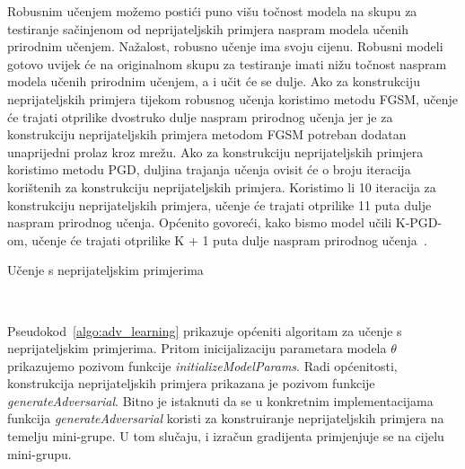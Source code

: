 \documentclass[times, utf8, zavrsni, numeric]{fer}
\newcommand{\pluseq}{\mathrel{+}=}
\begin{document}
\pagebreak

Robusnim učenjem možemo postići puno višu točnost modela na skupu za testiranje sačinjenom od neprijateljskih primjera naspram modela učenih prirodnim učenjem.
Nažalost, robusno učenje ima svoju cijenu. Robusni modeli gotovo uvijek će na originalnom skupu za testiranje imati nižu točnost naspram modela učenih prirodnim učenjem,
a i učit će se dulje. Ako za konstrukciju neprijateljskih primjera tijekom robusnog učenja koristimo metodu FGSM, učenje će trajati otprilike dvostruko dulje naspram prirodnog učenja
jer je za konstrukciju neprijateljskih primjera metodom FGSM potreban dodatan unaprijedni prolaz kroz mrežu. 
Ako za konstrukciju neprijateljskih primjera koristimo metodu PGD, duljina trajanja učenja ovisit će o broju iteracija korištenih za konstrukciju neprijateljskih primjera.
Koristimo li 10 iteracija za konstrukciju neprijateljskih primjera, učenje će trajati otprilike 11 puta dulje naspram prirodnog učenja. 
Općenito govoreći, kako bismo model učili K-PGD-om, učenje će trajati otprilike K + 1 puta dulje naspram prirodnog učenja~\cite{shafahi2019adversarial}.

\begin{algorithm}
    \caption{Učenje s neprijateljskim primjerima}
    \label{algo:adv_learning}
    \begin{algorithmic}
        \\\hrulefill
                \STATE{$grad \pluseq \nabla_{\theta}L(x_{adv},y_{i};\theta)$}
            \ENDFOR
        \ENDFOR
    \end{algorithmic}
\end{algorithm}

Pseudokod~\ref{algo:adv_learning} prikazuje općeniti algoritam za učenje s neprijateljskim primjerima.
Pritom inicijalizaciju parametara modela $\theta$ prikazujemo pozivom funkcije \textit{initializeModelParams}.
Radi općenitosti, konstrukcija neprijateljskih primjera prikazana je pozivom funkcije \textit{generateAdversarial}.
Bitno je istaknuti da se u konkretnim implementacijama funkcija \textit{generateAdversarial} koristi za konstruiranje neprijateljskih primjera na temelju mini-grupe.
U tom slučaju, i izračun gradijenta primjenjuje se na cijelu mini-grupu.
\end{document}
